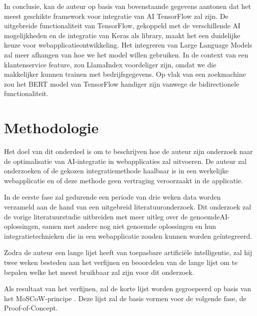 \documentclass[dutch]{hogent-article}
\begin{document}
In conclusie, kan de auteur op basis van bovenstaande gegevens aantonen dat het meest geschikte framework voor integratie van AI TensorFlow zal zijn. De uitgebreide functionaliteit van TensorFlow, gekoppeld met de verschillende AI mogelijkheden en de integratie van Keras als library, maakt het een duidelijke keuze voor webapplicatieontwikkeling. Het integreren van Large Language Models zal meer afhangen van hoe we het model willen gebruiken. In de context van een klantenservice feature, zou LlamaIndex voordeliger zijn, omdat we die makkelijker kunnen trainen met bedrijfsgegevens. Op vlak van een zoekmachine zou het BERT model van TensorFlow handiger zijn vanwege de bidirectionele functionaliteit.

\section{Methodologie}%
\label{sec:methodology}


Het doel van dit onderdeel is om te beschrijven hoe de auteur zijn onderzoek naar de optimalisatie van AI-integratie in webapplicaties zal uitvoeren. De auteur zal onderzoeken of de gekozen integratiemethode haalbaar is in een werkelijke webapplicatie en of deze methode geen vertraging veroorzaakt in de applicatie.

In de eerste fase zal gedurende een periode van drie weken data worden verzameld aan de hand van een uitgebreid literatuuronderzoek. Dit onderzoek zal de vorige literatuurstudie uitbreiden met meer uitleg over de genoemde\linebreak AI-oplossingen, samen met andere nog niet genoemde oplossingen en hun integratietechnieken die in een webapplicatie zouden kunnen worden geïntegreerd.

Zodra de auteur een lange lijst heeft van toepasbare artificiële intelligentie, zal hij twee weken besteden aan het verfijnen en beoordelen van de lange lijst om te bepalen welke het meest bruikbaar zal zijn voor dit onderzoek.

Als resultaat van het verfijnen, zal de korte lijst worden gegroepeerd op basis van het MoSCoW-principe \autocite{Nordenstam2014}. Deze lijst zal de basis vormen voor de volgende fase, de Proof-of-Concept.
\end{document}
